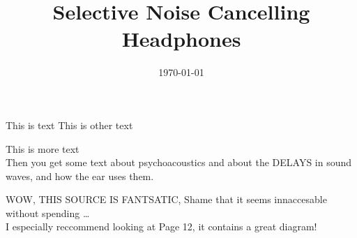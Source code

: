 \documentclass{ecsproject}
\title{Selective Noise Cancelling Headphones}
\date{\today}
\begin{document}
\maketitle

This is text \cite{EMHeadsets}
This is other text \cite{EMNoiseCancel}

This is more \cite{ICAAlg&Apps} text\\
Then you get some text about psychoacoustics \cite{MusCogCompSou} and about the DELAYS in sound waves, and how the ear uses them.

WOW, THIS SOURCE\cite{AdvancedDSPing} IS FANTSATIC, Shame that it seems innaccesable without spending \ldots \\
I especially reccommend looking at Page 12, it contains a great diagram!



\end{document}
